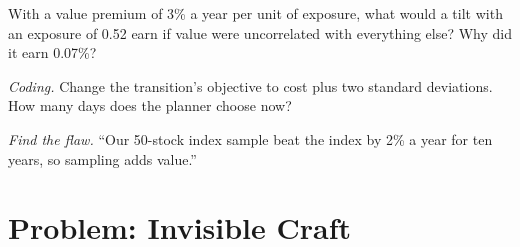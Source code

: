\begin{exercise}[$\star\star$]\label{exo:s1:the-asset-managers-strategies:6}
With a value premium of 3\% a year per unit of exposure, what would a tilt with an exposure of 0.52 earn if value were uncorrelated with everything else?
Why did it earn 0.07\%?
\end{exercise}

\begin{exercise}[$\star\star\star$]\label{exo:s1:the-asset-managers-strategies:7}
\emph{Coding.} Change the transition's objective to cost plus two standard deviations. How many days does the planner choose now?
\end{exercise}

\begin{exercise}[$\star\star\star$]\label{exo:s1:the-asset-managers-strategies:8}
\emph{Find the flaw.} ``Our 50-stock index sample beat the index by 2\% a year for ten years, so sampling adds value.''
\end{exercise}

\section{Problem: Invisible Craft}

